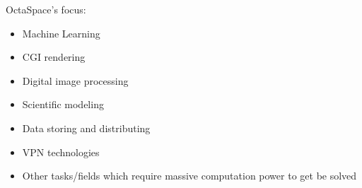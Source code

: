 OctaSpace's focus:

\begin{itemize}
    \item Machine Learning
    \item CGI rendering
    \item Digital image processing
    \item Scientific modeling
    \item Data storing and distributing
    \item VPN technologies
    \item Other tasks/fields which require massive computation power to get be solved
\end{itemize}
